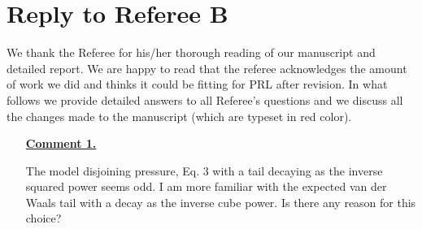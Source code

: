 \documentclass[12pt,english]{article}
\begin{document}


\section*{Reply to Referee B}

We thank the Referee for his/her thorough reading of our manuscript and detailed report.
We are happy to read that the referee acknowledges the amount of work we did and thinks it could be fitting for PRL after revision.
In what follows we provide detailed answers to all Referee's questions and we discuss all the changes made to the manuscript
(which are typeset in red color).

\begin{itemize}


\item[ \textbf{\underline{Comment 1.}}]
{
The model disjoining pressure, Eq. 3 with a tail decaying as the
inverse squared power seems odd. I am more familiar with the expected
van der Waals tail with a decay as the inverse cube power. Is there
any reason for this choice?

}
\end{itemize}
\end{document}

